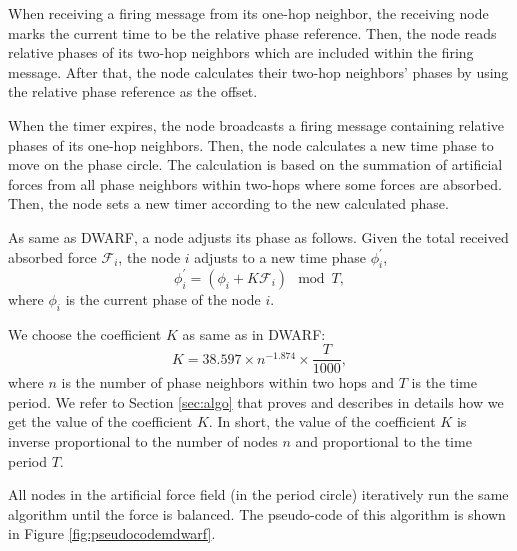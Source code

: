 When receiving a firing message from its one-hop neighbor, the receiving node marks the current time to be the relative phase reference. Then, the node reads relative phases of its two-hop neighbors which are included within the firing message. After that, the node calculates their two-hop neighbors' phases by using the relative phase reference as the offset.  

When the timer expires, the node broadcasts a firing message containing relative phases of its one-hop neighbors. 
Then, the node calculates a new time phase to move on the phase circle. The calculation is based on the summation of artificial forces from all phase neighbors within two-hops where some forces are absorbed. Then, the node sets a new timer according to the new calculated phase.

As same as DWARF, a node adjusts its phase as follows.
Given the total received absorbed force $\mathcal{F}_i$, the node $i$ adjusts to a new time phase $\phi_i^{'}$,
\begin{equation}
\phi_i^{'} = (\phi_i + K\mathcal{F}_i) \mod T,
\label{eq:newphase-mhop}
\end{equation} 
where $\phi_i$ is the current phase of the node $i$.

We choose the coefficient $K$ as same as in DWARF: 
\begin{equation}
K = 38.597 \times n^{-1.874} \times \frac{T}{1000},
\end{equation}
where $n$ is the number of phase neighbors within two hops and $T$ is the time period.
We refer to Section \ref{sec:algo} that proves and describes in details how we get the value of the coefficient $K$. In short, the value of the coefficient $K$ is inverse proportional to the number of nodes $n$ and proportional to the time period $T$.

All nodes in the artificial force field (in the period circle) iteratively run the same algorithm until the force is balanced.
The pseudo-code of this algorithm is shown in Figure \ref{fig:pseudocodemdwarf}.


